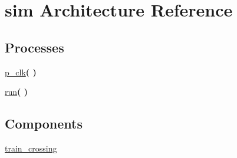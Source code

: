 \hypertarget{classtb__train__crossing_1_1sim}{}\section{sim Architecture Reference}
\label{classtb__train__crossing_1_1sim}
\subsection*{Processes}
 \begin{DoxyCompactItemize}
\item 
\mbox{\label{classtb__train__crossing_1_1sim_af35c81fcf5e4601a4e5d669b422cf79a}} 
\hyperlink{classtb__train__crossing_1_1sim_af35c81fcf5e4601a4e5d669b422cf79a}{p\+\_\+clk}{\bfseries  (  )}
\item 
\mbox{\label{classtb__train__crossing_1_1sim_a0f40b896b2461e250ebafd4e27b8ff54}} 
\hyperlink{classtb__train__crossing_1_1sim_a0f40b896b2461e250ebafd4e27b8ff54}{run}{\bfseries  (  )}
\end{DoxyCompactItemize}
\subsection*{Components}
 \begin{DoxyCompactItemize}
\item 
\mbox{\label{classtb__train__crossing_1_1sim_ab6ff94f39756fd00e991901159d1bfbf}} 
\hyperlink{classtb__train__crossing_1_1sim_ab6ff94f39756fd00e991901159d1bfbf}{train\+\_\+crossing}  {\bfseries }  
\end{DoxyCompactItemize}

